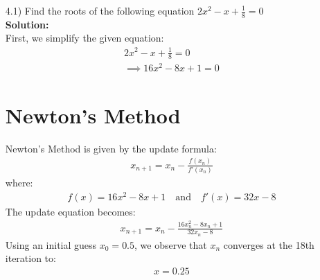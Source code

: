 \documentclass[journal]{IEEEtran}
\begin{document}
\begin{enumerate}
\item [4.1)] Find the roots of the following equation $2x^2 - x + \frac{1}{8} = 0$\\
\textbf{Solution:} \\
First, we simplify the given equation:
\begin{align}
    2x^2 - x + \frac{1}{8} = 0 \\
    \implies 16x^2 - 8x + 1 = 0
\end{align}

\section*{Newton's Method}
Newton's Method is given by the update formula:
\begin{align}
    x_{n+1} = x_n - \frac{f(x_n)}{f'(x_n)}
\end{align}
where:
\begin{align}
    f(x) = 16x^2 - 8x + 1 \quad \text{and} \quad f'(x) = 32x - 8
\end{align}
The update equation becomes:
\begin{align}
    x_{n+1} = x_n - \frac{16x_n^2 - 8x_n + 1}{32x_n - 8}
\end{align}
Using an initial guess $x_0 = 0.5$, we observe that $x_n$ converges at the 18th iteration to:
\begin{align}
    x = 0.25
\end{align}


\end{enumerate}
\end{document}
